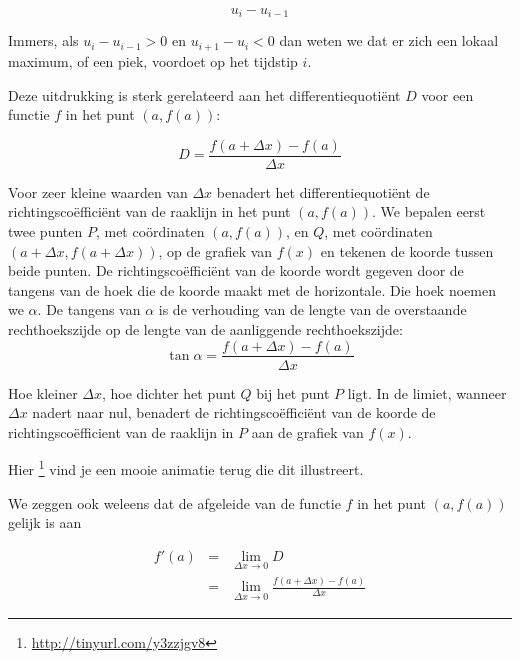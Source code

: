 \begin{equation*}
u_i-u_{i-1}
\end{equation*}

Immers, als $u_{i}-u_{i-1}>0$ en $u_{i+1}-u_{i}<0$ dan weten we dat er zich een lokaal maximum, of een piek, voordoet op het tijdstip $i$.

Deze uitdrukking is sterk gerelateerd aan het differentiequoti\"ent $D$ voor een functie $f$ in het punt $(a,f(a))$:

\begin{equation}
D = \frac{f(a+\Delta x) - f(a)}{\Delta x}
\end{equation}

Voor zeer kleine waarden van $\Delta x$ benadert het differentiequoti\"ent de richtingsco\"effici\"ent van de raaklijn in het punt $(a,f(a))$. 
We bepalen eerst twee punten $P$, met co\"ordinaten $(a,f(a))$, en $Q$, met co\"ordinaten $(a+\Delta x,f(a+\Delta x))$, op de grafiek van $f(x)$ en tekenen de koorde tussen beide punten.
De richtingsco\"effici\"ent van de koorde wordt gegeven door de tangens van de hoek die de koorde maakt met de horizontale. 
Die hoek noemen we $\alpha$.
De tangens van $\alpha$ is de verhouding van de lengte van de overstaande rechthoekszijde op de lengte van de aanliggende rechthoekszijde:
\begin{equation*}
\tan \alpha = \frac{f(a+\Delta x)-f(a)}{\Delta x}
\end{equation*}


Hoe kleiner $\Delta x$, hoe dichter het punt $Q$ bij het punt $P$ ligt. In de limiet, wanneer $\Delta x$ nadert naar nul, benadert de richtingsco\"effici\"ent van de koorde de richtingsco\"efficient van de raaklijn in $P$ aan de grafiek van $f(x)$.

Hier \footnote{\url{http://tinyurl.com/y3zzjgv8}} vind je een mooie animatie terug die dit illustreert.


We zeggen ook weleens dat de afgeleide van de functie $f$ in het punt $(a,f(a))$ gelijk is aan 

\begin{eqnarray*}
f'(a) &=& \lim\limits_{\Delta x \to 0} D \\
&=& \lim\limits_{\Delta x \to 0} \frac{f(a+\Delta x)-f(a)}{\Delta x}
\end{eqnarray*}

